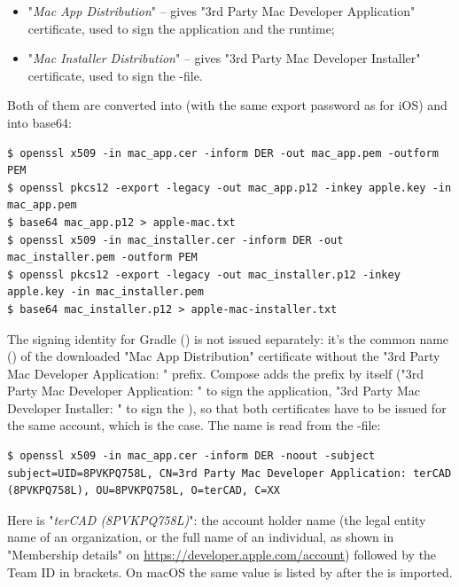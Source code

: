 \begin{itemize}
  \item "\emph{Mac App Distribution}" -- gives "3rd Party Mac Developer Application" certificate, used to sign the
  application and the runtime;
  \item "\emph{Mac Installer Distribution}" -- gives "3rd Party Mac Developer Installer" certificate, used to sign the
  -file.
\end{itemize}

\noindent Both of them are converted into  (with the same export password as for iOS) and into base64:

\begin{lstlisting}[language=terminal]
$ openssl x509 -in mac_app.cer -inform DER -out mac_app.pem -outform PEM
$ openssl pkcs12 -export -legacy -out mac_app.p12 -inkey apple.key -in mac_app.pem
$ base64 mac_app.p12 > apple-mac.txt
$ openssl x509 -in mac_installer.cer -inform DER -out mac_installer.pem -outform PEM
$ openssl pkcs12 -export -legacy -out mac_installer.p12 -inkey apple.key -in mac_installer.pem
$ base64 mac_installer.p12 > apple-mac-installer.txt
\end{lstlisting}

\noindent The signing identity for Gradle () is not issued separately: it's the common name
() of the downloaded "Mac App Distribution" certificate without the "3rd Party Mac Developer Application: "
prefix. Compose adds the prefix by itself ("3rd Party Mac Developer Application: " to sign the application,
"3rd Party Mac Developer Installer: " to sign the ), so that both certificates have to be issued for the same
account, which is the case. The name is read from the -file:

\begin{lstlisting}[language=terminal]
$ openssl x509 -in mac_app.cer -inform DER -noout -subject
subject=UID=8PVKPQ758L, CN=3rd Party Mac Developer Application: terCAD (8PVKPQ758L), OU=8PVKPQ758L, O=terCAD, C=XX
\end{lstlisting}

\noindent Here  is "\emph{terCAD (8PVKPQ758L)}": the account holder name (the legal entity
name of an organization, or the full name of an individual, as shown in "Membership details" on
\href{https://developer.apple.com/account}{https://developer.apple.com/account}) followed by the Team ID in brackets.
On macOS the same value is listed by  after the  is imported.

